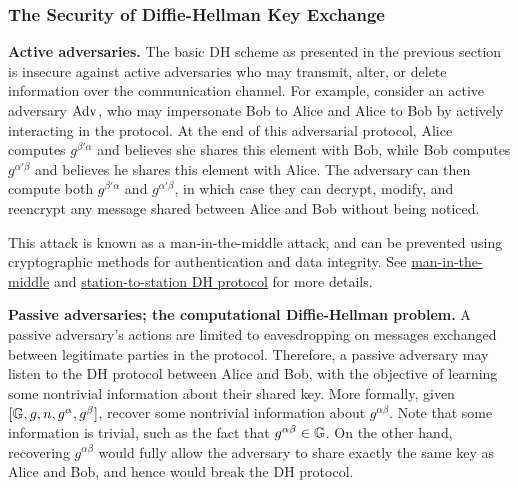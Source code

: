 \subsubsection{The Security of Diffie-Hellman Key Exchange}

{\bf Active adversaries.} The basic DH scheme as presented in the previous 
section is insecure against active adversaries who may transmit, alter, or delete 
information over the communication channel. For example, consider an active 
adversary ${\rm Adv}$, who may impersonate Bob to Alice and Alice to Bob by 
actively interacting in the protocol. At the end of this adversarial protocol, 
Alice computes $g^{\beta'\alpha}$ and believes she shares this element with Bob, 
while Bob computes $g^{\alpha'\beta}$ and believes he shares this element with 
Alice. The adversary can then compute both $g^{\beta'\alpha}$ and $g^{\alpha'\beta}$, 
in which case they can decrypt, modify, and reencrypt any message shared between 
Alice and Bob without being noticed. 

\begin{center}
\end{center}

This attack is known as a man-in-the-middle attack, and can be prevented using 
cryptographic methods for authentication and data integrity. See 
\href{https://en.wikipedia.org/wiki/Man-in-the-middle_attack}{man-in-the-middle}
and \href{https://en.wikipedia.org/wiki/Station-to-Station_protocol}
{station-to-station DH protocol} for more details. 

{\bf Passive adversaries; the computational Diffie-Hellman problem.} A passive 
adversary's actions are limited to eavesdropping on messages exchanged between 
legitimate parties in the protocol. Therefore, a passive adversary may listen to 
the DH protocol between Alice and Bob, with the objective of learning some 
nontrivial information about their shared key. More formally, given 
$[\mathbb{G}, g, n, g^\alpha, g^\beta]$, recover some nontrivial information about 
$g^{\alpha\beta}$. Note that some information is trivial, such as the fact that 
$g^{\alpha\beta} \in \mathbb{G}$. On the other hand, recovering $g^{\alpha\beta}$ would 
fully allow the adversary to share exactly the same key as Alice and Bob, 
and hence would break the DH protocol. 

